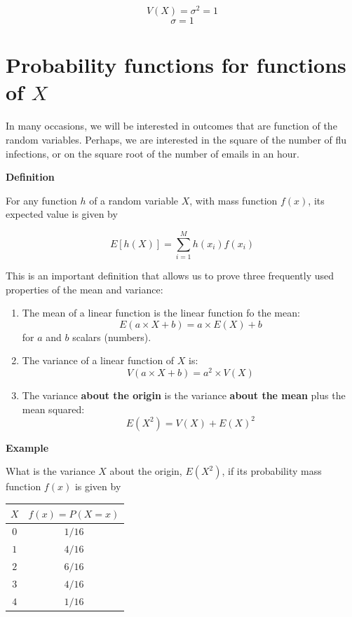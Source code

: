\documentclass[
]{book}
\begin{document}
\[V(X)=\sigma^2=1\]
\[\sigma=1\]

\hypertarget{probability-functions-for-functions-of-x}{%
\section{\texorpdfstring{Probability functions for functions of \(X\)}{Probability functions for functions of X}}\label{probability-functions-for-functions-of-x}}

In many occasions, we will be interested in outcomes that are function of the random variables. Perhaps, we are interested in the square of the number of flu infections, or on the square root of the number of emails in an hour.

\textbf{Definition}

For any function \(h\) of a random variable \(X\), with mass function \(f(x)\), its expected value is given by

\[ E[h(X)]= \sum_{i=1}^M h(x_i) f(x_i) \]

This is an important definition that allows us to prove three frequently used properties of the mean and variance:

\begin{enumerate}
\def\labelenumi{\arabic{enumi})}
\item
  The mean of a linear function is the linear function fo the mean: \[E(a\times X +b)= a\times E(X) +b\] for \(a\) and \(b\) scalars (numbers).
\item
  The variance of a linear function of \(X\) is:\[V(a\times X +b)= a^2\times V(X)\]
\item
  The variance \textbf{about the origin} is the variance \textbf{about the mean} plus the mean squared: \[E(X^2)=V(X)+E(X)^2\]
\end{enumerate}

\textbf{Example}

What is the variance \(X\) about the origin, \(E(X^2)\), if its probability mass function \(f(x)\) is given by

\begin{longtable}[]{@{}cc@{}}
\toprule\noalign{}
\(X\) & \(f(x)=P(X=x)\) \\
\midrule\noalign{}
\endhead
\bottomrule\noalign{}
\endlastfoot
\(0\) & \(1/16\) \\
\(1\) & \(4/16\) \\
\(2\) & \(6/16\) \\
\(3\) & \(4/16\) \\
\(4\) & \(1/16\) \\
\end{longtable}
\end{document}
